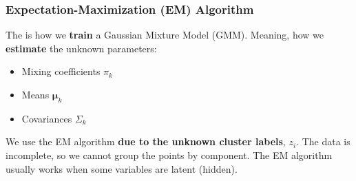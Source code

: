 \subsubsection{Expectation-Maximization (EM) Algorithm}

The  is how we \textbf{train} a Gaussian Mixture Model (GMM). Meaning, how we \textbf{estimate} the unknown parameters:
\begin{itemize}
    \item Mixing coefficients $\pi_{k}$
    \item Means $\boldsymbol{\mu}_{k}$
    \item Covariances $\Sigma_{k}$
\end{itemize}
We use the EM algorithm \textbf{due to the unknown cluster labels}, $z_{i}$. The data is incomplete, so we cannot group the points by component. The EM algorithm usually works when some variables are latent (hidden).


